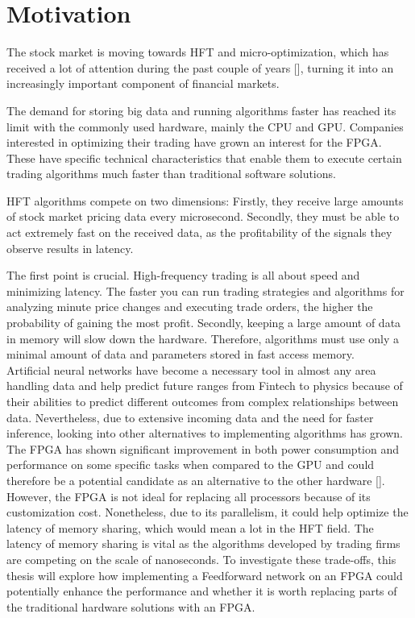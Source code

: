 \section{Motivation}
\label{sec:motivation}
The stock market is moving towards \acrshort{HFT} and micro-optimization, which has received a lot of attention during the past couple of years [\cite{agarwal2012high}], turning it into an increasingly important component of financial markets. 

The demand for storing big data and running algorithms faster has reached its limit with the commonly used hardware, mainly the \acrshort{CPU} and \acrshort{GPU}. Companies interested in optimizing their trading have grown an interest for the \acrshort{FPGA}. These have specific technical characteristics that enable them to execute certain trading algorithms much faster than traditional software solutions. 

HFT algorithms compete on two dimensions: Firstly, they receive large amounts of stock market pricing data every microsecond.
Secondly, they must be able to act extremely fast on the received data, as the profitability of the signals they observe results in latency.

The first point is crucial. High-frequency trading is all about speed and minimizing latency. The faster you can run trading strategies and algorithms for analyzing minute price changes and executing trade orders, the higher the probability of gaining the most profit. 
Secondly, keeping a large amount of data in memory will slow down the hardware. Therefore, algorithms must use only a minimal amount of data and parameters stored in fast access memory. \\
Artificial neural networks have become a necessary tool in almost any area handling data and help predict future ranges from \ac{Fintech} to physics because of their abilities to predict different outcomes from complex relationships between data. Nevertheless, due to extensive incoming data and the need for faster inference, looking into other alternatives to implementing algorithms has grown. The FPGA has shown significant improvement in both power consumption and performance on some specific tasks when compared to the GPU and could therefore be a potential candidate as an alternative to the other hardware [\cite{FPGA}]. However, the FPGA is not ideal for replacing all processors because of its customization cost. Nonetheless, due to its parallelism, it could help optimize the latency of memory sharing, which would mean a lot in the \acrshort{HFT} field. The latency of memory sharing is vital as the algorithms developed by trading firms are competing on the scale of nanoseconds. To investigate these trade-offs, this thesis will explore how implementing a Feedforward network on an FPGA could potentially enhance the performance and whether it is worth replacing parts of the traditional hardware solutions with an FPGA.


